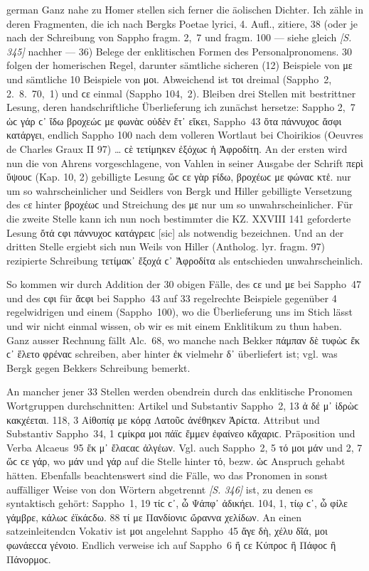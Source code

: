 \begin{otherlanguage*}{german}
Ganz nahe zu Homer stellen sich ferner die äolischen Dichter. Ich zähle in deren Fragmenten, die ich nach Bergks Poetae lyrici, 4. Aufl., zitiere, 38 (oder je nach der Schreibung von Sappho fragm. 2,~7 und fragm. 100 — siehe gleich \hypertarget{p345}{\emph{[S. 345]}}\label{p345} nachher — 36) Belege der enklitischen Formen des Personalpronomens. 30 folgen der homerischen Regel, darunter sämtliche sicheren (12) Beispiele von με und sämtliche 10 Beispiele von μοι. Abweichend ist τοι dreimal (Sappho~2, 2.~8.~70,~1) und ϲε einmal (Sappho 104,~2). Bleiben drei Stellen mit bestrittner Lesung, deren handschriftliche Überlieferung ich zunächst hersetze: Sappho 2,~7 ὡϲ γάρ ϲ᾽ ἴδω βροχεώϲ με φωνὰϲ οὐδὲν ἔτ᾽ εἴκει, Sappho~43 ὄτα πάννυχοϲ ἄσφι κατάργει, endlich Sappho 100 nach dem volleren Wortlaut bei Choirikios (Oeuvres de Charles Graux II 97) … ϲὲ τετίμηκεν ἐξόχωϲ ἡ Ἀφροδίτη. An der ersten wird nun die von Ahrens vorgeschlagene, von Vahlen in seiner Ausgabe der Schrift περὶ ὕψουϲ (Kap. 10, 2) gebilligte Lesung ὥϲ ϲε γὰρ ϝίδω, βροχέωϲ με φώναϲ κτἑ. nur um so wahrscheinlicher und Seidlers von Bergk und Hiller gebilligte Versetzung des cε hinter βροχέωϲ und Streichung des με nur um so unwahrscheinlicher. Für die zweite Stelle kann ich nun noch bestimmter die KZ. XXVIII 141 geforderte Lesung ὄτά ϲφι πάννυχοϲ κατάγρειϲ [sic] als notwendig bezeichnen. Und an der dritten Stelle ergiebt sich nun Weils von Hiller (Antholog. lyr. fragm. 97) rezipierte Schreibung τετίμακ᾽ ἔξοχά ϲ᾽ Ἀφροδίτα als entschieden unwahrscheinlich.

So kommen wir durch Addition der 30 obigen Fälle, des ϲε und με bei Sappho~47 und des ϲφι für ἄϲφι bei Sappho~43 auf 33 regelrechte Beispiele gegenüber 4 regelwidrigen und einem (Sappho~100), wo die Überlieferung uns im Stich lässt und wir nicht einmal wissen, ob wir es mit einem Enklitikum zu thun haben. Ganz ausser Rechnung fällt Alc.~68, wo manche nach Bekker πάμπαν δὲ τυφὼϲ ἔκ ϲ᾽ ἕλετο φρέναϲ schreiben, aber hinter ἐκ vielmehr δ᾽ überliefert ist; vgl. was Bergk gegen Bekkers Schreibung bemerkt.

An mancher jener 33 Stellen werden obendrein durch das enklitische Pronomen Wortgruppen durchschnitten: Artikel und Substantiv Sappho~2, 13 ἀ δέ μ᾽ ἰδρὼϲ κακχέεται. 118, 3 Αἰθοπίᾳ με κόρᾳ Λατοῦϲ ἀνέθηκεν Ἀρίϲτα. Attribut und Substantiv Sappho~34, 1 ϲμίκρα μοι πάϊϲ ἔμμεν ἐφαίνεο κἄχαριϲ. Präposition und Verba Alcaeus~95 ἔκ μ᾽ ἔλαϲαϲ ἀλγέων. Vgl. auch Sappho~2, 5 τό μοι μάν und 2, 7 ὥϲ ϲε γάρ, wo μάν und γάρ auf die Stelle hinter τό, bezw. ὡϲ Anspruch gehabt hätten. Ebenfalls beachtenswert sind die Fälle, wo das Pronomen in sonst auffälliger Weise von don Wörtern abgetrennt \hypertarget{p346}{\emph{[S. 346]}}\label{p346} ist, zu denen es syntaktisch gehört: Sappho~1, 19 τίϲ ϲ᾽, ὦ Ψάπφ᾽ ἀδικήει. 104, 1, τίῳ ϲ᾽, ὦ φίλε γάμβρε, κάλωϲ ἐϊκάϲδω. 88 τί με Πανδίονιϲ ὤραννα χελίδων. An einen satzeinleitendcn Vokativ ist μοι angelehnt Sappho~45 ἄγε δὴ, χέλυ δῖά, μοι φωνάεϲϲα γένοιο. Endlich verweise ich auf Sappho~6 ἤ ϲε Κύπροϲ ἢ Πάφοϲ ἢ Πάνορμοϲ.


\end{otherlanguage*}
